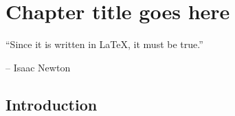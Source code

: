 \chapter{Chapter title goes here} \label{chap:chap-3}



\epigraph{\enquote{Since it is written in \LaTeX, it must be true.}}{-- Isaac Newton}




\section{Introduction}
\Blindtext[4]       %